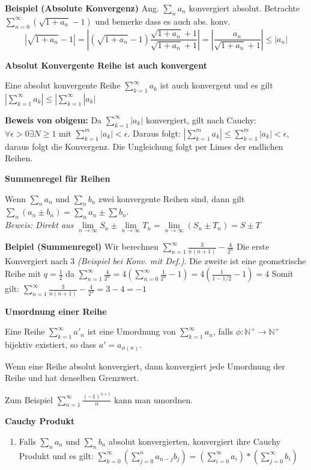 \documentclass[25pt]{sciposter}
\newcommand{\limm}{\lim\limits_{n \to \infty}}
\newcommand{\N}{\mathbb{N}}
\newenvironment{method}[1]{\begin{mdframed}[backgroundcolor=blue!10,innertopmargin=15pt, innerbottommargin=15pt, nobreak=true]
		\textbf{#1 }
	}
	{ 
	\end{mdframed}
}
\begin{document}
\begin{multicols}{3}
\textbf{Beispiel (Absolute Konvergenz)} Ang. $\sum_{n} a_n$ konvergiert absolut. Betrachte $\sum_{n=0}^{\infty} (\sqrt{1 + a_n} -1)$ und bemerke dass es auch abs. konv.
$$\left|\sqrt{1 + a_n} -1\right| = \left| (\sqrt{1 + a_n} -1) \frac{\sqrt{1 + a_n} +1}{\sqrt{1 + a_n} +1} \right| = \left| \frac{a_n}{\sqrt{1 + a_n} + 1} \right| \leq |a_n|$$


\begin{method}{Absolut Konvergente Reihe ist auch konvergent}
Eine absolut konvergente Reihe $\sum _{k=1} ^{\infty} a_k$ ist auch konvergent und es gilt $\left|\sum_{k=1}^{\infty} a_k \right| \leq |\sum_{k=1}^{\infty} |a_k|$
\end{method}
\textbf{Beweis von obigem:} Da $\sum_{k=1}^{\infty} |a_k|$ konvergiert, gilt nach Cauchy: $\forall \epsilon > 0 \exists N \geq 1$ mit $\sum_{k=1}^{m} |a_k| < \epsilon$. Daraus folgt: $\left| \sum_{k=1}^{m} a_k \right| \leq \sum_{k=1}^{m} |a_k| < \epsilon$, daraus folgt die Konvergenz. Die Ungleichung folgt per Limes der endlichen Reihen.

\begin{method}{Summenregel für Reihen}
	Wenn $\sum_n a_n$ und $\sum_n b_n$ zwei konvergente Reihen sind, dann gilt $\sum_n (a_n \pm b_n ) = \sum_n a_n \pm \sum b_n$.\\
	\textit{Beweis: Direkt aus $\limm S_n \pm \limm T_n = \limm (S_n \pm T_n)  = S \pm T$}
\end{method}
\textbf{Beipiel (Summenregel)}
Wir berechnen $\sum_{n=1}^\infty \frac{3}{n(n+1)} - \frac{4}{2^n}$ Die erste Konvergiert nach $3$ \textit{(Beispiel bei Konv. mit Def.)}. Die zweite ist eine geometrische Reihe mit $q=\frac{1}{2}$ da $\sum_{n=1}^{\infty} \frac{4}{2^n} = 4\left( \sum_{n=0}^{\infty} \frac{1}{2^n} -1 \right) = 4 \left( \frac{1}{1-1/2} -1\right) = 4$
Somit gilt: $\sum_{n=1}^\infty \frac{3}{n(n+1)} - \frac{4}{2^n} = 3-4 = -1$ 


\begin{method}{Umordnung einer Reihe}
	Eine Reihe $\sum_{k=1}^{\infty} a'_n$ ist eine Umordnung von $\sum_{k=1}^{\infty} a_n$, falls $\phi : \N^+ \to \N^+$ bijektiv existiert, so dass $a' = a_{\phi(n)}$.
	
	Wenn eine Reihe absolut konvergiert, dann konvergiert jede Umordnung der Reihe und hat denselben Grenzwert.
	
	Zum Beispiel $\sum _{{n=1}}^{\infty }{\frac{(-1)^{{n+1}}}{n}}$ kann man umordnen.
\end{method}


\begin{method}{Cauchy Produkt}
	\begin{enumerate}
\item 	Falls $\sum_{n} a_n$ und $\sum_n b_n$ absolut konvergierten, konvergiert ihre Cauchy Produkt und es gilt:
$\sum_{k=0}^{\infty} \left(\sum_{j=0}^{n} a_{n-j} b_j\right) = \left(\sum_{i=0}^\infty a_i\right) * \left(\sum_{j=0}^\infty b_i\right)$


\end{enumerate}
\end{method}
\end{multicols}
\end{document}

